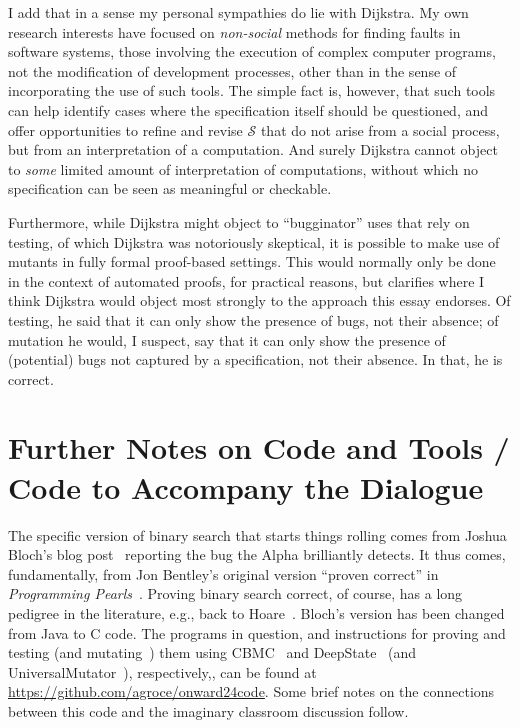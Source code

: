 \documentclass[sigplan]{acmart}
\begin{document}
I add that in a sense my personal sympathies do lie with
Dijkstra.  My own research interests have focused on \emph{non-social} methods
for finding faults in software systems, those involving the execution
of complex computer programs, not the modification of development
processes, other than in the sense of incorporating the use of such tools.
The simple fact is, however, that such tools can help identify cases
where the specification itself should be questioned, and offer
opportunities to refine and revise $\mathcal{S}$ that do not arise
from a social process, but from an interpretation of a computation.
And surely Dijkstra cannot object to \emph{some} limited amount of
interpretation of computations, without which no specification can be
seen as meaningful or checkable.

Furthermore, while Dijkstra might object to ``bugginator'' uses that
rely on testing, of which Dijkstra was notoriously skeptical, it is
possible to make use of mutants in fully formal proof-based settings.  This would
normally only be done in the context of automated proofs, for
practical reasons, but clarifies where I think Dijkstra would object
most strongly to the approach this essay endorses.  Of testing, he said that it can only show the presence
of bugs, not their absence; of mutation he would, I suspect, say that
it can only show the presence of (potential) bugs not captured by a
specification, not their absence.  In that, he is correct.

\section{Further Notes on Code and Tools / Code to Accompany the Dialogue}

The specific version of binary search that starts things rolling comes from Joshua Bloch's blog post~\cite{bloch} reporting
the bug the Alpha brilliantly detects.  It thus comes, fundamentally, from Jon Bentley's original version ``proven
correct'' in \emph{Programming Pearls}~\cite{Pearls}. Proving binary
search correct, of course, has a long pedigree in the literature, e.g., back to
Hoare~\cite{hoare1971proof}.  Bloch's version  has
been changed from Java to C code.  The programs in question, and instructions
for proving and testing (and mutating~\cite{MutationSurvey}) them using CBMC~\cite{CBMCp} and
DeepState~\cite{goodman2018deepstate} (and UniversalMutator~\cite{SyntaxUM}), respectively,, can be found at
\url{https://github.com/agroce/onward24code}.  Some brief notes on the
connections between this code and the imaginary classroom discussion follow.
\end{document}

